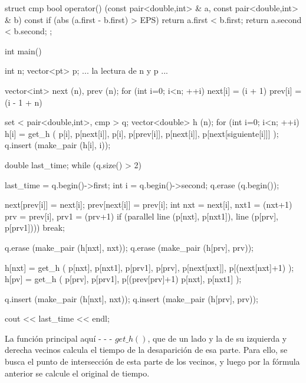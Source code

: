 struct cmp {
bool operator() (const pair<double,int> & a, const pair<double,int> & b) const {
if (abs (a.first - b.first) > EPS)
return a.first < b.first;
return a.second < b.second;
}
};

int main() {
int n;
vector<pt> p;
... la lectura de n y p ...

vector<int> next (n), prev (n);
for (int i=0; i<n; ++i) {
next[i] = (i + 1) %
prev[i] = (i - 1 + n) %
}

set < pair<double,int>, cmp > q;
vector<double> h (n);
for (int i=0; i<n; ++i) {
h[i] = get_h (
p[i], p[next[i]],
p[i], p[prev[i]],
p[next[i]], p[next[siguiente[i]]]
);
q.insert (make_pair (h[i], i));
}

double last_time;
while (q.size() > 2) {
last_time = q.begin()->first;
int i = q.begin()->second;
q.erase (q.begin());

next[prev[i]] = next[i];
prev[next[i]] = prev[i];
int nxt = next[i], nxt1 = (nxt+1)%
prv = prev[i], prv1 = (prv+1)%
if (parallel line (p[nxt], p[nxt1]), line (p[prv], p[prv1])))
break;

q.erase (make_pair (h[nxt], nxt));
q.erase (make_pair (h[prv], prv));

h[nxt] = get_h (
p[nxt], p[nxt1],
p[prv1], p[prv],
p[next[nxt]], p[(next[nxt]+1)%
);
h[pv] = get_h (
p[prv], p[prv1],
p[(prev[prv]+1)%
p[nxt], p[nxt1]
);

q.insert (make_pair (h[nxt], nxt));
q.insert (make_pair (h[prv], prv));
}

cout << last_time << endl;
}
\endcode

La función principal aquí - - - $get\_h()$, que de un lado y la de su izquierda y derecha vecinos calcula el tiempo de la desaparición de esa parte. Para ello, se busca el punto de intersección de esta parte de los vecinos, y luego por la fórmula anterior se calcule el original de tiempo.
